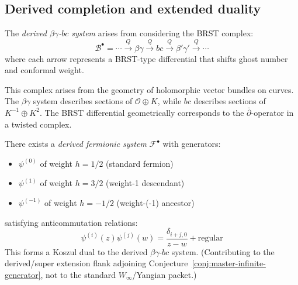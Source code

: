 \subsection{Derived completion and extended duality}

\begin{definition}\label{def:derived-bg-bc}
The \emph{derived $\beta\gamma$-$bc$ system} arises from considering the BRST complex:
\[
\mathcal{B}^{\bullet} = \cdots \xrightarrow{Q} \beta\gamma \xrightarrow{Q} bc \xrightarrow{Q} \beta'\gamma' \xrightarrow{Q} \cdots
\]
where each arrow represents a BRST-type differential that shifts ghost number and conformal weight.
\end{definition}

\begin{remark}
This complex arises from the geometry of holomorphic vector bundles 
on curves. The $\beta\gamma$ system describes sections of $\mathcal{O} \oplus K$, while $bc$ describes 
sections of $K^{-1} \oplus K^2$. The BRST differential geometrically corresponds to the 
$\bar{\partial}$-operator in a twisted complex.
\end{remark}

\begin{conjecture}\label{conj:extended-ferm-ghost}
There exists a \emph{derived fermionic system} $\mathcal{F}^{\bullet}$ with generators:
\begin{itemize}
\item $\psi^{(0)}$ of weight $h = 1/2$ (standard fermion)
\item $\psi^{(1)}$ of weight $h = 3/2$ (weight-1 descendant)
\item $\psi^{(-1)}$ of weight $h = -1/2$ (weight-(-1) ancestor)
\end{itemize}
satisfying anticommutation relations:
\[
\psi^{(i)}(z)\psi^{(j)}(w) = \frac{\delta_{i+j,0}}{z-w} + \text{regular}
\]
This forms a Koszul dual to the derived $\beta\gamma$-$bc$ system.
(Contributing to the derived/super extension flank adjoining
Conjecture~\ref{conj:master-infinite-generator}, not to the standard
$W_\infty$/Yangian packet.)
\end{conjecture}


